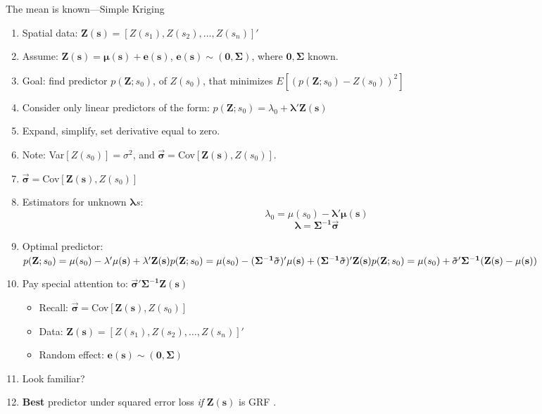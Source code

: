 \documentclass{article}
\begin{document}
The mean is known---Simple Kriging
\begin{enumerate}
\item Spatial data: $\mathbf{Z(s)} = [Z(s_{1}), Z(s_{2}),\hdots, Z(s_{n})]'$

\item Assume: $\mathbf{Z(s) = \mu(s) + e(s)}$, $\mathbf{e(s) \sim (0, \Sigma)}$, where $\mathbf{0, \Sigma}$ known.

\item Goal: find predictor $p(\mathbf{Z};s_{0})$, of $Z(s_{0})$, that minimizes $E\left[ \left(p(\mathbf{Z};s_{0}) - Z(s_{0}) \right)^{2}\right]$ 

\item Consider only linear predictors of the form: $p(\mathbf{Z};s_{0}) = \lambda_{0} + \mathbf{\lambda 'Z(s)}$

\item Expand, simplify, set derivative equal to zero.

\item Note: Var$[Z(s_{0})] = \sigma^{2}$, and $\mathbf{\vec{\sigma} =}$Cov$[\mathbf{Z(s)},Z(s_{0})]$.

\item $\mathbf{\vec{\sigma} =}$Cov$[\mathbf{Z(s)},Z(s_{0})]$

\item Estimators for unknown $\mathbf{\lambda}s$:
$$ \lambda_{0} = \mu(s_{0}) - \mathbf{\lambda'\mu(s)} $$
$$ \mathbf{\lambda = \Sigma^{-1}\vec{\sigma}} $$

\item Optimal predictor: \\ 
$p(\mathbf{Z};s_{0}) = \mu(s_{0}) - \mathbf{\lambda'\mu(s)} + \mathbf{\lambda}'\mathbf{Z(s)} \\
p(\mathbf{Z};s_{0}) = \mu(s_{0}) - (\mathbf{\Sigma^{-1}\vec{\sigma}})'\mathbf{\mu(s)} + (\mathbf{\Sigma^{-1}\vec{\sigma}})'\mathbf{Z(s)} \\
p(\mathbf{Z};s_{0}) = \mu(s_{0}) + \mathbf{ \vec{\sigma}'\Sigma^{-1}(Z(s) - \mu(s)) }$

\item Pay special attention to: $\mathbf{ \vec{\sigma}'\Sigma^{-1}Z(s)}$
  \begin{itemize}
  \item Recall: $\mathbf{\vec{\sigma} =}$Cov$[\mathbf{Z(s)},Z(s_{0})]$
  \item Data: $\mathbf{Z(s)} = [Z(s_{1}), Z(s_{2}),\hdots, Z(s_{n})]'$
  \item Random effect: $\mathbf{e(s) \sim (0, \Sigma)}$
  \end{itemize}

\item Look familiar?

\item {\bf Best} predictor under squared error loss {\it if } $\mathbf{Z(s)}$ is GRF .
\end{enumerate}


\end{document}
